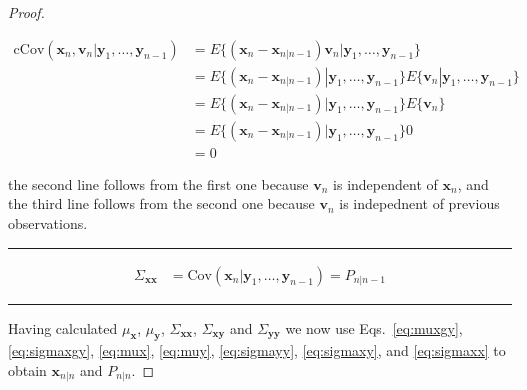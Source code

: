 \documentclass[12pt]{article}
\begin{document}
\begin{proof}
\begin{itemize}
            \begin{align*}
                \text{cCov}(\mathbf{x}_n,\mathbf{v}_n|\mathbf{y}_1,\ldots,\mathbf{y}_{n-1})&=E\{(\mathbf{x}_n-\mathbf{x}_{n|n-1})\mathbf{v}_n|\mathbf{y}_1,\ldots,\mathbf{y}_{n-1}\}\\
                                                                                           &=E\{(\mathbf{x}_n-\mathbf{x}_{n|n-1})|\mathbf{y}_1,\ldots,\mathbf{y}_{n-1}\}E\{\mathbf{v}_n|\mathbf{y}_1,\ldots,\mathbf{y}_{n-1}\}\\
                                                                                           &=E\{(\mathbf{x}_n-\mathbf{x}_{n|n-1})|\mathbf{y}_1,\ldots,\mathbf{y}_{n-1}\}E\{\mathbf{v}_n\}\\
                                                                                           &=E\{(\mathbf{x}_n-\mathbf{x}_{n|n-1})|\mathbf{y}_1,\ldots,\mathbf{y}_{n-1}\}0\\
                                                                                           &=0
            \end{align*}

            the second line follows from the first one because $\mathbf{v}_n$
            is independent of $\mathbf{x}_n$, and the third line follows from
            the second one because $\mathbf{v}_n$ is indepednent of previous
            observations.

    \end{itemize}
    \rule{2in}{0.4pt}

    \begin{align}
        \Sigma_{\mathbf{x}\mathbf{x}}&=\text{Cov}(\mathbf{x}_n|\mathbf{y}_1,\ldots,\mathbf{y}_{n-1})=P_{n|n-1}\label{eq:sigmaxx}
    \end{align}

    \rule{2in}{0.4pt}

    Having calculated $\mu_{\mathbf{x}}$, $\mu_{\mathbf{y}}$,
    $\Sigma_{\mathbf{x}\mathbf{x}}$, $\Sigma_{\mathbf{x}\mathbf{y}}$ and
    $\Sigma_{\mathbf{y}\mathbf{y}}$ we now use Eqs.~\ref{eq:muxgy},
    \ref{eq:sigmaxgy}, \ref{eq:mux},  \ref{eq:muy},  \ref{eq:sigmayy},
    \ref{eq:sigmaxy}, and \ref{eq:sigmaxx} to  
    obtain $\mathbf{x}_{n|n}$ and $P_{n|n}$.


\end{proof}
\end{document}
